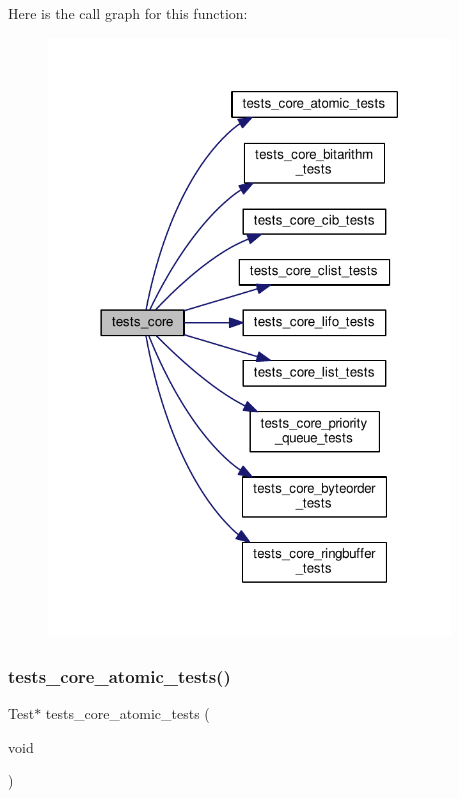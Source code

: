 Here is the call graph for this function\+:
\nopagebreak
\begin{figure}[H]
\begin{center}
\leavevmode
\includegraphics[width=302pt]{group__unittests_gaaaf35c94f5a45e12f3556bf2be09b022_cgraph}
\end{center}
\end{figure}
\mbox{\label{group__unittests_gadc7f89b561245603549db45a06d93cce}} 
\subsubsection{\texorpdfstring{tests\+\_\+core\+\_\+atomic\+\_\+tests()}{tests\_core\_atomic\_tests()}}
{\footnotesize\ttfamily Test$\ast$ tests\+\_\+core\+\_\+atomic\+\_\+tests (\begin{DoxyParamCaption}\item[{void}]{ }\end{DoxyParamCaption})}



